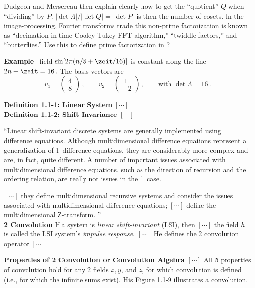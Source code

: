 \begin{description}
Dudgeon and Mersereau then explain clearly how to get the
``quotient'' $Q$ when ``dividing'' by $P$. $|\det\Lambda|/|\det Q| =
|\det P|$ is then the number of cosets. In the image-processing, Fourier
transforms trade this non-prime factorization is known as
``decimation-in-time Cooley-Tukey FFT algorithm,'' ``twiddle factors,''
and ``butterflies.''
      {
     Use this to define prime factorization in ?
     }

{\bf Example} \Reqv\ field
\(
\sin [2\pi (n/8+\zeit/16)]
\)
is constant along the line
\(
2n+\zeit=16
\,.
\)
The basis vectors are
\[
v_1=\begin{pmatrix}
  4\\8
    \end{pmatrix}
  \,,\qquad
v_2=\begin{pmatrix}
  ~1\\-2
     \end{pmatrix}
  \,,\qquad
\mbox{with } \det\Lambda=16
  \,.
\]

\textbf{Definition 1.1-1: Linear System} $[\cdots]$ \\

\textbf{Definition 1.1-2: Shift Invariance} $[\cdots]$

``Linear shift-invariant discrete systems are generally implemented using
difference equations. Although multidimensional difference equations
represent a generalization of 1\dmn\ difference equations, they are
considerably more complex and are, in fact, quite different. A number of
important issues associated with multidimensional difference equations,
such as the direction of recursion and the ordering relation, are really
not issues in the 1\dmn\ case.

$[\cdots]$ they define multidimensional recursive systems and consider
the issues associated with multidimensional difference equations;
$[\cdots]$  define the multidimensional Z-transform.
''
\\

\textbf{2{\dmn} Convolution}
If a system is \emph{linear shift-invariant} (LSI), then  $[\cdots]$
%
the field $h$ is called the LSI system's \emph{impulse response}.
 $[\cdots]$
He defines the 2{\dmn} convolution operator  $[\cdots]$

\textbf{Properties of 2{\dmn} Convolution or Convolution Algebra}  $[\cdots]$
All 5 properties of convolution hold for any 2{\dmn} fields $x, y$, and $z$,
for which convolution is defined (i.e., for which the infinite sums
exist). His Figure 1.1-9 illustrates a convolution.
\\


\end{description}
